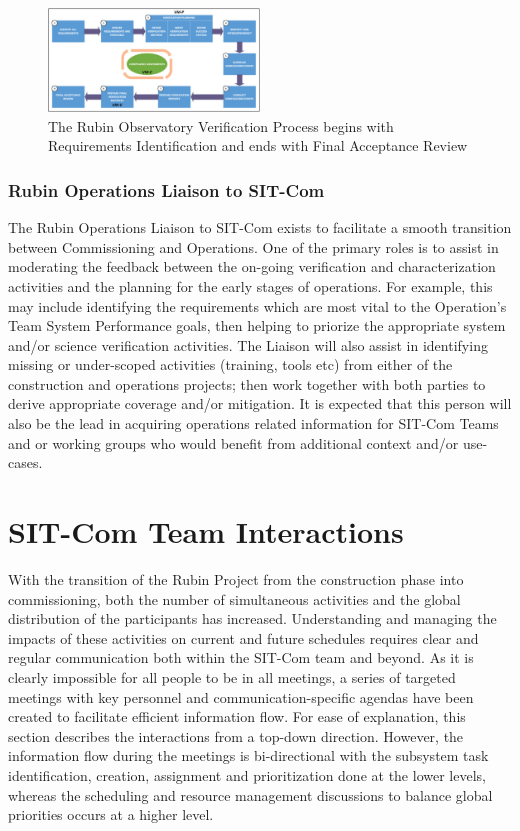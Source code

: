 \documentclass[SE,lsstdraft,authoryear,toc]{lsstdoc, lsstdraft}
\begin{document}
\begin{figure}[h]
    \centering
    \includegraphics[width=0.5\textwidth]{static/verification_process}
    \caption{The Rubin Observatory Verification Process begins with Requirements Identification and ends with Final Acceptance Review}
    \label{fig:verification_process}
\end{figure}


\subsubsection{Rubin Operations Liaison to SIT-Com}
\label{sec:SCLT_liason_to_ops}

The Rubin Operations Liaison to SIT-Com exists to facilitate a smooth transition between Commissioning and Operations.
One of the primary roles is to assist in moderating the feedback between the on-going verification and characterization activities and the planning for the early stages of operations.
For example, this may include identifying the requirements which are most vital to the Operation's Team System Performance goals, then helping to priorize the appropriate system and/or science verification activities.
The Liaison will also assist in identifying missing or under-scoped activities (training, tools etc) from either of the construction and operations projects; then work together with both parties to derive appropriate coverage and/or mitigation.
It is expected that this person will also be the lead in acquiring operations related information for SIT-Com Teams and or working groups who would benefit from additional context and/or use-cases.

\section{SIT-Com Team Interactions}
\label{sec:interactions}
With the transition of the Rubin Project from the construction phase into commissioning, both the number of simultaneous activities and the global distribution of the participants has increased.
Understanding and managing the impacts of these activities on current and future schedules requires clear and regular communication both within the SIT-Com team and beyond.
As it is clearly impossible for all people to be in all meetings, a series of targeted meetings with key personnel and communication-specific agendas have been created to facilitate efficient information flow.
For ease of explanation, this section describes the interactions from a top-down direction.
However, the information flow during the meetings is bi-directional with the subsystem task identification, creation, assignment and prioritization done at the lower levels, whereas the scheduling and resource management discussions to balance global priorities occurs at a higher level.
\end{document}
